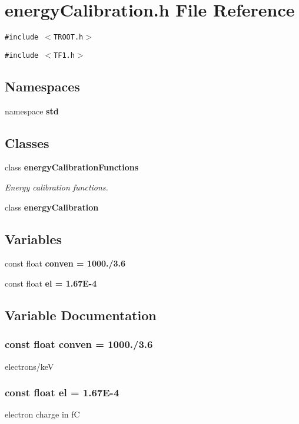 \section{energy\-Calibration.h File Reference}
\label{energyCalibration_8h}
{\tt \#include $<$TROOT.h$>$}\par
{\tt \#include $<$TF1.h$>$}\par
\subsection*{Namespaces}
\begin{CompactItemize}
\item 
namespace \bf{std}
\end{CompactItemize}
\subsection*{Classes}
\begin{CompactItemize}
\item 
class \bf{energy\-Calibration\-Functions}
\begin{CompactList}\small\item\em Energy calibration functions. \item\end{CompactList}\item 
class \bf{energy\-Calibration}
\end{CompactItemize}
\subsection*{Variables}
\begin{CompactItemize}
\item 
const float \bf{conven} = 1000./3.6
\item 
const float \bf{el} = 1.67E-4
\end{CompactItemize}


\subsection{Variable Documentation}
\subsubsection{\setlength{\rightskip}{0pt plus 5cm}const float \bf{conven} = 1000./3.6}\label{energyCalibration_8h_a48a6c1eb7d418c5d0618fbb161ae321}


electrons/ke\-V 
\subsubsection{\setlength{\rightskip}{0pt plus 5cm}const float \bf{el} = 1.67E-4}\label{energyCalibration_8h_d1db7b454cab6ae1749310d7f444849b}


electron charge in f\-C 
